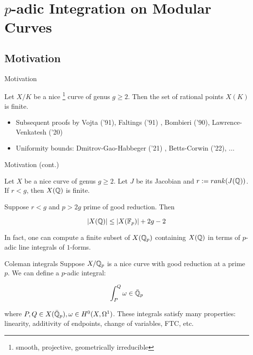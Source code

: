 \section{$p$-adic Integration on Modular Curves}

\subsection{Motivation}

\begin{frame}{Motivation}
\begin{theorem}[Faltings '83]
Let $X/K$ be a nice \footnote{smooth, projective, geometrically irreducible} curve of genus $g \geq 2$. Then the set of rational points $X(K)$ is finite.
\end{theorem} \pause
\begin{itemize}
\item Subsequent proofs by Vojta ('91), Faltings ('91) , Bombieri ('90), Lawrence-Venkatesh ('20) \pause
\item Uniformity bounds: Dmitrov-Gao-Habbeger ('21) , Betts-Corwin ('22), ...
\end{itemize}
\end{frame}

\begin{frame}{Motivation (cont.)}
\begin{theorem}[Chabauty '41]
Let $X$ be a nice curve of genus $g \geq 2$. Let $J$ be its Jacobian and $r:= rank(J(\mathbb{Q}))$. If $r < g$, then $X(\mathbb{Q})$ is finite.
\end{theorem} \pause

\begin{theorem}[Coleman '85]
Suppose $r < g$ and $p > 2g$ prime of good reduction. Then

\[
|X(\mathbb{Q})| \leq |X(\mathbb{F}_p)| + 2g -2 
\]

\pause In fact, one can compute a finite subset of $X(\mathbb{Q}_p)$ containing $X(\mathbb{Q})$ in terms of $p$-adic line integrals of $1$-forms.
\end{theorem}
\end{frame}

\begin{frame}{Coleman integrals}
Suppose $X/\mathbb{Q}_p$ is a nice curve with good reduction at a prime $p$. We can define a $p$-adic integral:

\[
\int_P^Q \omega \in \bar{\mathbb{Q}}_p
\]

where $P,Q \in X(\bar{\mathbb{Q}}_p), \omega \in H^0(X, \Omega^1)$. \pause These integrals satisfy many properties: linearity, additivity of endpoints, change of variables, FTC, etc.
\end{frame}


